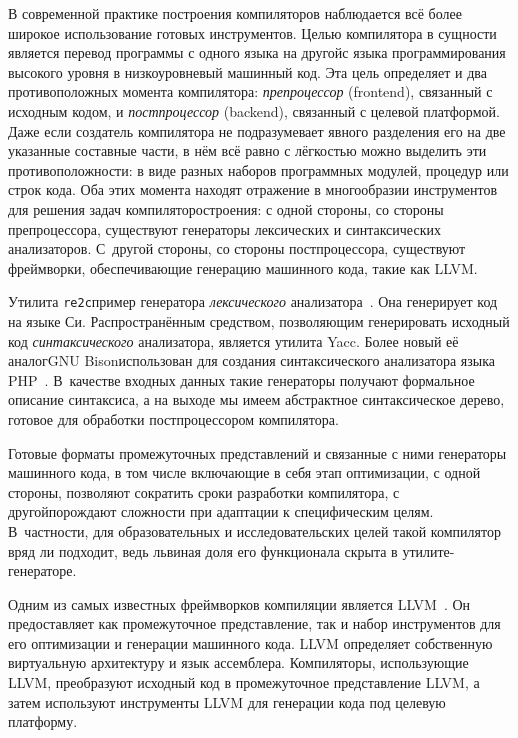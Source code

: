 \documentclass[utf8]{lgu}
\newcommand{\tire}{\unskip\nobreak\thinspace\textemdash\thinspace}
\newcommand{\code}[1]{{\normalsize\texttt{#1}}}
\begin{document}
\firstparskip В современной практике построения компиляторов наблюдается всё более широкое использование готовых инструментов. Целью компилятора в сущности является перевод программы с одного языка на другой\tire с языка программирования высокого уровня в низкоуровневый машинный код. Эта цель определяет и два противоположных момента компилятора: \textit{препроцессор} (frontend), связанный с исходным кодом, и \textit{постпроцессор} (backend), связанный с целевой платформой. Даже если создатель компилятора не подразумевает явного разделения его на две указанные составные части, в нём всё равно с лёгкостью можно выделить эти противоположности: в виде разных наборов программных модулей, процедур или строк кода. Оба этих момента находят отражение в многообразии инструментов для решения задач компиляторостроения: с одной стороны, со стороны препроцессора, существуют генераторы лексических и синтаксических анализаторов. С~другой стороны, со стороны постпроцессора, существуют фреймворки, обеспечивающие генерацию машинного кода, такие как LLVM.

Утилита \code{re2c}\tire пример генератора \textit{лексического} анализатора~\cite{Re2c}. Она генерирует код на языке Си. Распространённым средством, позволяющим генерировать исходный код \textit{синтаксического} анализатора, является утилита Yacc. Более новый её аналог\tire GNU Bison\tire использован для создания синтаксического анализатора языка PHP~\cite{PhpBison}. В~качестве входных данных такие генераторы получают формальное описание синтаксиса, а на выходе мы имеем абстрактное синтаксическое дерево, готовое для обработки постпроцессором компилятора.

Готовые форматы промежуточных представлений и связанные с ними генераторы машинного кода, в том числе включающие в себя этап оптимизации, с одной стороны, позволяют сократить сроки разработки компилятора, с другой\tire порождают сложности при адаптации к специфическим целям. В~частности, для образовательных и исследовательских целей такой компилятор вряд ли подходит, ведь львиная доля его функционала скрыта в утилите-генераторе.

Одним из самых известных фреймворков компиляции является LLVM~\cite{LLVM}. Он предоставляет как промежуточное представление, так и набор инструментов для его оптимизации и генерации машинного кода. LLVM определяет собственную виртуальную архитектуру и язык ассемблера. Компиляторы, использующие LLVM, преобразуют исходный код в промежуточное представление LLVM, а затем используют инструменты LLVM для генерации кода под целевую платформу.
\end{document}

